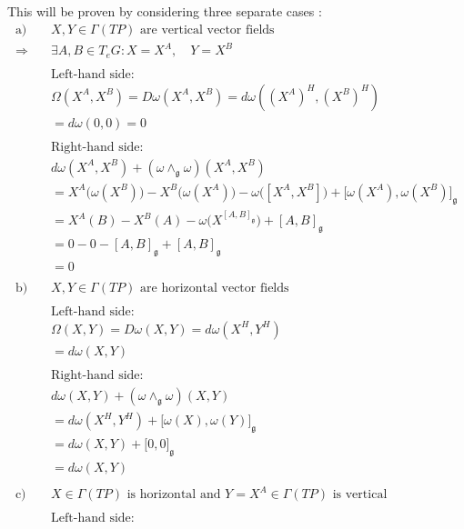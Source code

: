 This will be proven by considering three separate cases \cite{FredericSchullerCurvaturetorsionprincipalbundlesLec24FredericSchuller2015}:
\begin{align*}
  \text{a)} \quad & X, Y \in \Gamma(TP) \text{ are vertical vector fields} \\
  \Rightarrow\quad & \exists A, B \in T_eG : X = X^A, \quad Y = X^B \\
  \\
  & \text{Left-hand side:} \\
  & \Omega(X^A, X^B) = D\omega(X^A, X^B) = d\omega\left( (X^A)^H, (X^B)^H \right) \\
  &= d\omega(0, 0) = 0 \\
  \\
  & \text{Right-hand side:} \\
  & d\omega(X^A, X^B) + (\omega \wedge_{\mathfrak{g}} \omega)(X^A, X^B) \\
  &= X^A \big( \omega(X^B) \big) - X^B \big( \omega(X^A) \big) - \omega\big( [X^A, X^B] \big) + \big[ \omega(X^A), \omega(X^B) \big]_{\mathfrak{g}} \\
  &= X^A (B) - X^B (A) - \omega\big( X^{[A,B]_\mathfrak{g}} \big) + [A,B]_{\mathfrak{g}} \\
  &= 0 - 0 - [A,B]_{\mathfrak{g}} + [A,B]_{\mathfrak{g}} \\
  &= 0 \\
  \\ 
  \text{b)} \quad & X, Y \in \Gamma(TP) \text{ are horizontal vector fields} \\
  \\
  & \text{Left-hand side:} \\
  & \Omega(X,Y) = D\omega(X,Y) = d\omega(X^H, Y^H) \\
  &= d\omega(X, Y) \\
  \\
  &\text{Right-hand side:} \\
  & d\omega(X,Y) + (\omega \wedge_{\mathfrak{g}} \omega)(X,Y) \\
  &= d\omega(X^H, Y^H) + \big[ \omega(X), \omega(Y) \big]_\mathfrak{g} \\
  &= d\omega(X,Y) + \big[ 0, 0 \big]_\mathfrak{g} \\
  &= d\omega(X,Y) \\
  \\
  \text{c)} \quad & X \in \Gamma(TP) \text{ is horizontal and } Y=X^A \in \Gamma(TP) \text{ is vertical} \\
  \\
  & \text{Left-hand side:} \\

\end{align*}
